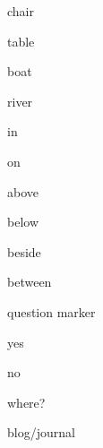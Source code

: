 \begin{flashcard}{\LARGE chair}
\LARGE {}
\end{flashcard}
\begin{flashcard}{\LARGE table}
\LARGE {}
\end{flashcard}
\begin{flashcard}{\LARGE boat}
\LARGE {}
\end{flashcard}
\begin{flashcard}{\LARGE river}
\LARGE {}
\end{flashcard}
\begin{flashcard}{\LARGE in}
\LARGE {}
\end{flashcard}
\begin{flashcard}{\LARGE on}
\LARGE {}
\end{flashcard}
\begin{flashcard}{\LARGE above}
\LARGE {}
\end{flashcard}
\begin{flashcard}{\LARGE below}
\LARGE {}
\end{flashcard}
\begin{flashcard}{\LARGE beside}
\LARGE {}
\end{flashcard}
\begin{flashcard}{\LARGE between}
\LARGE {}
\end{flashcard}
\begin{flashcard}{\LARGE question marker}
\LARGE {}
\end{flashcard}
\begin{flashcard}{\LARGE yes}
\LARGE {}
\end{flashcard}
\begin{flashcard}{\LARGE no}
\LARGE {}
\end{flashcard}
\begin{flashcard}{\LARGE where?}
\LARGE {}
\end{flashcard}
\begin{flashcard}{\LARGE blog/journal}
\LARGE {}
\end{flashcard}
